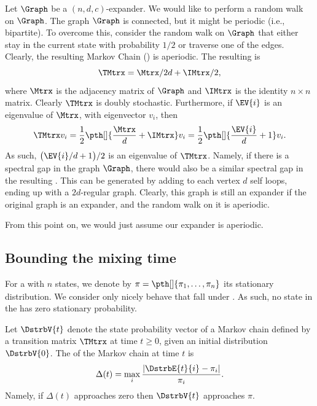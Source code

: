 Let $\Graph$ be a $(n,d,c)$-expander. We would like to perform a
random walk on $\Graph$. The graph $\Graph$ is connected, but it might
be periodic (i.e., bipartite). To overcome this, consider the random
walk on $\Graph$ that either stay in the current state with
probability $1/2$ or traverse one of the edges. Clearly, the resulting
Markov Chain (\MC) is aperiodic. The resulting  is
\begin{equation*}
    \TMtrx = \Mtrx / 2d + \IMtrx/2,
\end{equation*}
where $\Mtrx$ is the adjacency matrix of $\Graph$ and $\IMtrx$ is the
identity $n\times n$ matrix. Clearly $\TMtrx$ is doubly
stochastic. Furthermore, if $\EV{i}$ is an eigenvalue of $\Mtrx$, with
eigenvector $v_i$, then
\begin{equation*}
    \TMtrx v_i%
    =%
    \frac{1}{2} \pth[]{ \frac{\Mtrx}{d} + \IMtrx} v_i%
    =%
    \frac{1}{2} \pth[]{ \frac{\EV{i}}{d} + 1} v_i.
\end{equation*}
As such, $\bigl(\EV{i}/{d} + 1 \bigr)/2$ is an eigenvalue of
$\TMtrx$. Namely, if there is a spectral gap in the graph
$\Graph$, there would also be a similar spectral gap in the resulting
\MC. This \MC can be generated by adding to each vertex
$d$ self loops, ending up with a
$2d$-regular graph. Clearly, this graph is still an expander if the
original graph is an expander, and the random walk on it is aperiodic.

From this point on, we would just assume our expander is aperiodic.


\subsection{Bounding the mixing time}

For a \MC with $n$ states, we denote by
$\pi = \pth[]{\bigl.\pi_1, \ldots, \pi_n}$ its stationary
distribution. We consider only nicely behave \MC that fall under
. As such, no state in the \MC has zero stationary
probability.

\begin{defn}
    Let $\DstrbV{t}$ denote the state probability vector of a Markov
    chain defined by a transition matrix $\TMtrx$ at time $t \geq 0$,
    given an initial distribution $\DstrbV{0}$. The  of the Markov chain at time $t$ is
    \begin{equation*}
        \Delta(t)%
        =%
        \max_i \frac{|\DstrbE{t}{i} - \pi_i|}{\pi_i}.
    \end{equation*}
    Namely, if $\Delta(t)$ approaches zero then $\DstrbV{t}$
    approaches $\pi$.
\end{defn}


